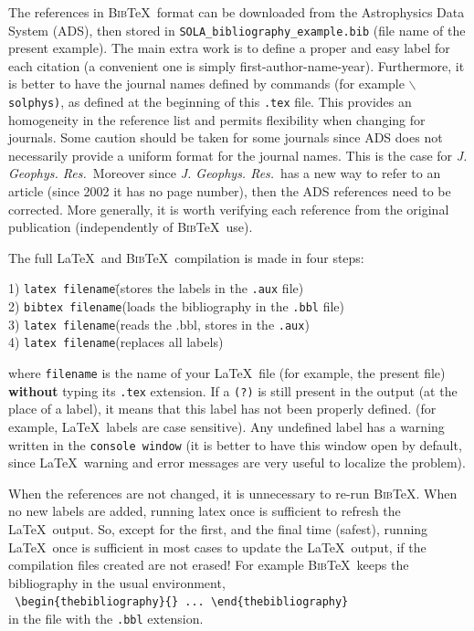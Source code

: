 \documentclass[namedreferences]{SolarPhysics}
\newcommand{\BibTeX}{\textsc{Bib}\TeX}
\newcommand{\jgr}{    {\it J. Geophys. Res.}}
\begin{document}
\begin{article}
  The references in \BibTeX\ format can be downloaded from the 
Astrophysics Data System (ADS), then stored
in \verb+SOLA_bibliography_example.bib+  (file name of the present example).
The main extra work is to define a proper and easy label for each citation
(a convenient one is simply first-author-name-year).  Furthermore, it is better
to have the journal names defined by commands (for example 
\texttt{$\backslash$solphys)}, as defined at the beginning of 
this \texttt{.tex} file.
This provides an homogeneity in the reference list and permits flexibility
when changing for journals.   Some caution should be taken for some journals
since ADS does not necessarily provide a uniform format for the
journal names. This is the case for \jgr\  Moreover since
\jgr\ has a new way to refer to an article 
(since 2002 it has no page number), then the ADS references need to be corrected. 
More generally, it is worth verifying
each reference from the original publication (independently of \BibTeX\ use).

   The full \LaTeX\ and \BibTeX\ compilation is made in four steps: 
\begin{tabbing}
1) {\tt latex filename}\qquad\qquad\=(stores the labels in the {\tt .aux} file)\\
2) {\tt bibtex filename}\>(loads the bibliography in the {\tt .bbl} file)\\
3) {\tt latex filename}\>(reads the .bbl, stores in the {\tt .aux})\\
4) {\tt latex filename}\>(replaces all labels)  
\end{tabbing}
   where \texttt{filename} is the name of your \LaTeX\ file (for example, 
the present file) {\bf without} typing its \texttt{.tex} extension.
If a \texttt{(?)} is still present in the output (at the place of a label),
it means that this label has not been properly defined. 
 (for example, \LaTeX\ labels are case sensitive).
Any undefined label has a warning written in the \texttt{console window}
(it is better to have this window open by default, since \LaTeX\ warning and 
error messages are very useful to localize the problem).

  When the references are not changed, it is unnecessary to re-run \BibTeX .
When no new labels are added, running latex once is sufficient to refresh
the \LaTeX\ output. So, except for
the first, and the final time (safest), running \LaTeX\ once is sufficient
in most cases to update the \LaTeX\ output, if the compilation files 
created are not erased! For example \BibTeX\ keeps the bibliography in the usual 
environment,\\
  \verb+ \begin{thebibliography}{} ... \end{thebibliography}+\\
in the file with the \verb+.bbl+ extension.  


\end{article}
\end{document}
